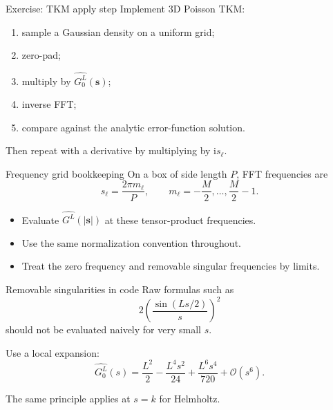 \documentclass[aspectratio=169,11pt]{beamer}
\newcommand{\cO}{\mathcal{O}}
\newcommand{\ii}{\mathrm i}
\newcommand{\s}{\bm{s}}
\begin{document}
\begin{frame}{Exercise: TKM apply step}
\small
Implement 3D Poisson TKM:
\begin{enumerate}
  \item sample a Gaussian density on a uniform grid;
  \item zero-pad;
  \item multiply by $\widehat{G_0^L}(\s)$;
  \item inverse FFT;
  \item compare against the analytic error-function solution.
\end{enumerate}

\vspace{2mm}
Then repeat with a derivative by multiplying by $\ii s_\ell$.
\end{frame}

\begin{frame}{Frequency grid bookkeeping}
\small
On a box of side length $P$, FFT frequencies are
\[
  s_\ell=\frac{2\pi m_\ell}{P},
  \qquad
  m_\ell=-\frac{M}{2},\ldots,\frac{M}{2}-1.
\]

\begin{itemize}
  \item Evaluate $\widehat{G^L}(|\s|)$ at these tensor-product frequencies.
  \item Use the same normalization convention throughout.
  \item Treat the zero frequency and removable singular frequencies by limits.
\end{itemize}
\end{frame}

\begin{frame}{Removable singularities in code}
\small
Raw formulas such as
\[
  2\left(\frac{\sin(Ls/2)}{s}\right)^2
\]
should not be evaluated naively for very small $s$.

\vspace{2mm}
Use a local expansion:
\[
  \widehat{G_0^L}(s)=
  \frac{L^2}{2}
  -\frac{L^4s^2}{24}
  +\frac{L^6s^4}{720}
  +\cO(s^6).
\]

\vspace{1mm}
The same principle applies at $s=k$ for Helmholtz.
\end{frame}
\end{document}
